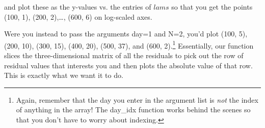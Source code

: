 \documentclass{article}
\begin{document}
and plot these as the y-values vs. the entries of $lams$ so that you
get the points (100, 1), (200, 2),\ldots, (600, 6) on log-scaled axes.

Were you instead to pass the arguments day=1 and N=2, you'd plot (100,
5), (200, 10), (300, 15), (400, 20), (500, 37), and (600,
2).\footnote{Again, remember that the day you enter in the argument
  list is \emph{not} the index of anything in the array!  The day\_idx
  function works behind the scenes so that you don't have to worry
  about indexing.}  Essentially, our function slices the
three-dimensional matrix of all the residuals to pick out the row of
residual values that interests you and then plots the absolute value
of that row.  This is exactly what we want it to do.
\end{document}
